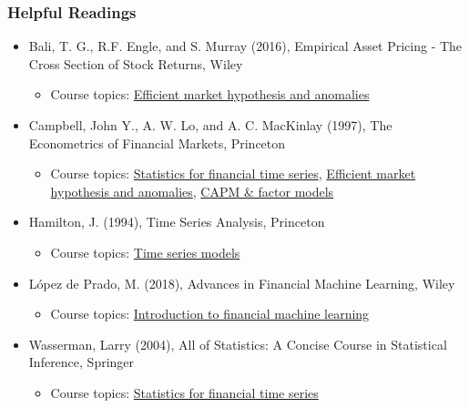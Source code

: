 \documentclass[xcolor=dvipsnames, english, 8pt]{beamer}
\begin{document}
\begin{frame}
    \frametitle{Helpful Readings}
    \begin{itemize}
    \item Bali, T. G., R.F. Engle, and S. Murray (2016), Empirical Asset Pricing - The Cross Section of Stock Returns, Wiley 
    \begin{itemize}
    \item Course topics: \hyperlink{EMH}{Efficient market hypothesis and anomalies}\vspace{0.25cm}\\
    \end{itemize}
   \item Campbell, John Y., A. W. Lo, and A. C. MacKinlay (1997), The Econometrics of Financial Markets, Princeton \begin{itemize}
   \item Course topics: \hyperlink{ret_char}{Statistics for financial time series}, \hyperlink{EMH}{Efficient market hypothesis and anomalies}, \hyperlink{CAPM}{CAPM \& factor models}\vspace{0.25cm}\\\end{itemize}
    \item Hamilton, J. (1994), Time Series Analysis, Princeton\begin{itemize}
    \item  Course topics: \hyperlink{TS}{Time series models}\vspace{0.25cm}\\\end{itemize}
    \item López de Prado, M. (2018), Advances in Financial Machine Learning, Wiley\begin{itemize}
    \item  Course topics: \hyperlink{ML}{Introduction to financial machine learning}\vspace{0.25cm}\\\end{itemize}
   \item Wasserman, Larry (2004), All of Statistics: A Concise Course in Statistical Inference, Springer\begin{itemize}
   \item  Course topics: \hyperlink{ret_char}{Statistics for financial time series}\end{itemize}
\end{itemize}
\end{frame}
\end{document}
